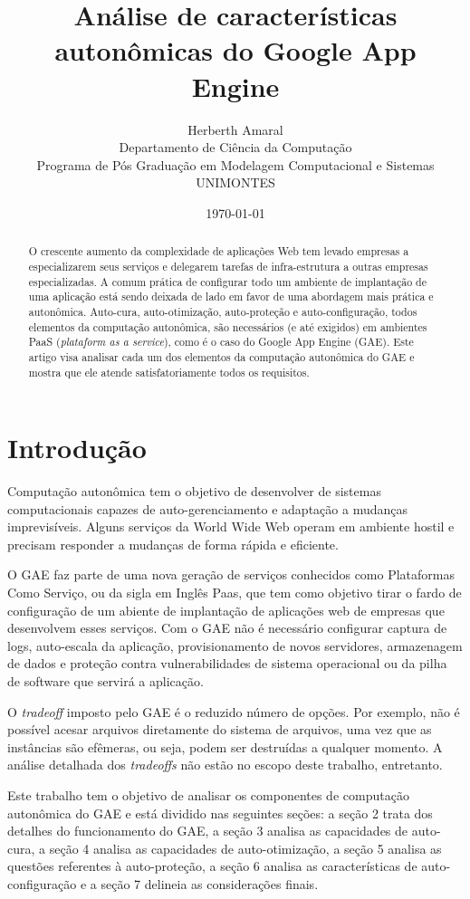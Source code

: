 \documentclass[12pt]{article}
\title{Análise de características autonômicas do Google App Engine}
\author{
        Herberth Amaral \\
                Departamento de Ciência da Computação\\
                Programa de Pós Graduação em Modelagem Computacional e Sistemas\\
        UNIMONTES\\
}
\date{\today}
\begin{document}
\maketitle

\begin{abstract}
    O crescente aumento da complexidade de aplicações Web tem levado empresas a
    especializarem seus serviços e delegarem tarefas de infra-estrutura a
    outras empresas especializadas. A comum prática de configurar todo um
    ambiente de implantação de uma aplicação está sendo deixada de lado em
    favor de uma abordagem mais prática e autonômica.  Auto-cura,
    auto-otimização, auto-proteção e auto-configuração, todos elementos da
    computação autonômica, são necessários (e até exigidos) em ambientes PaaS
    (\textit{plataform as a service}), como é o caso do Google App Engine (GAE).
    Este artigo visa analisar cada um dos elementos da computação autonômica do
    GAE e mostra que ele atende satisfatoriamente todos os requisitos.
\end{abstract}

\section{Introdução}
Computação autonômica tem o objetivo de desenvolver de sistemas computacionais
capazes de auto-gerenciamento e adaptação a mudanças imprevisíveis. Alguns
serviços da World Wide Web operam em ambiente hostil e precisam responder a
mudanças de forma rápida e eficiente.

O GAE faz parte de uma nova geração de serviços conhecidos como Plataformas
Como Serviço, ou da sigla em Inglês Paas, que tem como objetivo tirar o fardo
de configuração de um abiente de implantação de aplicações web de empresas que
desenvolvem esses serviços. Com o GAE não é necessário configurar captura de
logs, auto-escala da aplicação, provisionamento de novos servidores,
armazenagem de dados e proteção contra vulnerabilidades de sistema operacional
ou da pilha de software que servirá a aplicação.

O \textit{tradeoff} imposto pelo GAE é o reduzido número de opções. Por
exemplo, não é possível acesar arquivos diretamente do sistema de arquivos, uma
vez que as instâncias são efêmeras, ou seja, podem ser destruídas a qualquer
momento. A análise detalhada dos \textit{tradeoffs} não estão no escopo deste
trabalho, entretanto.

Este trabalho tem o objetivo de analisar os componentes de computação
autonômica do GAE e está dividido nas seguintes seções: a seção 2 trata dos
detalhes do funcionamento do GAE, a seção 3 analisa as capacidades de
auto-cura, a seção 4 analisa as capacidades de auto-otimização, a seção 5
analisa as questões referentes à auto-proteção, a seção 6 analisa as
características de auto-configuração e a seção 7 delineia as considerações
finais.
\end{document}
